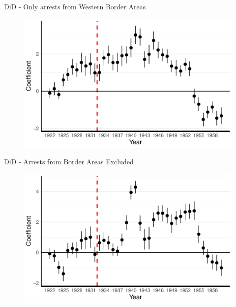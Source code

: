 \documentclass[11pt]{beamer}
\begin{document}
\begin{frame}[label=did_border_area_west]{DiD - Only arrests from Western Border Areas}
 \begin{figure}[h]
\centering
\includegraphics[width=1\textwidth]{point_range_robust_cr2_border_provinces_western.pdf}
\end{figure}
\hyperlink{add_content}{}
\end{frame}


\begin{frame}[label=did_non_border_area]{DiD - Arrests from Border Areas Excluded}
 \begin{figure}[h]
\centering
\includegraphics[width=1\textwidth]{point_range_robust_cr2_non_border_provinces.pdf}
\end{figure}
\hyperlink{robustness_checks}{}
\end{frame}
\end{document}
